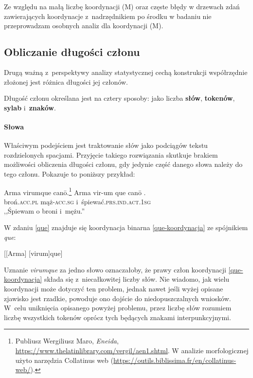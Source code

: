 Ze względu na małą liczbę koordynacji (M) oraz częste błędy w drzewach zdań zawierających koordynacje z~nadrzędnikiem po środku w badaniu nie przeprowadzam osobnych analiz dla koordynacji (M).

\subsection{Obliczanie długości członu}

Drugą ważną z~perspektywy analizy statystycznej cechą konstrukcji współrzędnie złożonej jest różnica długości jej członów.

Długość członu określana jest na cztery sposoby: jako liczba \textbf{słów}, \textbf{tokenów}, \textbf{sylab} i~\textbf{znaków}.

\paragraph{Słowa}
Właściwym podejściem jest traktowanie słów jako podciągów tekstu rozdzielonych spacjami. Przyjęcie takiego rozwiązania skutkuje brakiem możliwości obliczenia długości członu, gdy jedynie część danego słowa należy do tego członu. Pokazuje to poniższy przykład:

\begin{exe}
\ex  \label{que}
Arma virumque canō.\footnote{Publiusz Wergiliusz Maro, \textit{Eneida},
\url{https://www.thelatinlibrary.com/vergil/aen1.shtml}. W analizie morfologicznej użyto narzędzia Collatinus web (\url{https://outils.biblissima.fr/en/collatinus-web/}).}
\gll Arma vir-um que canō . \\
broń\textsc{.acc.pl} mąż\textsc{-acc.sg} i~śpiewać\textsc{.prs.ind.act.1sg} \\
\glt ,,Śpiewam o broni i~mężu.''
\end{exe}

W zdaniu \eqref{que} znajduje się koordynacja binarna \eqref{que-koordynacja} ze spójnikiem \textit{que}:

\begin{exe}
\ex \label{que-koordynacja}
{[[Arma] [virum]que]}
\end{exe}

Uznanie \textit{virumque} za jedno słowo oznaczałoby, że prawy człon koordynacji \eqref{que-koordynacja} składa się z~niecałkowitej liczby słów. Nie wiadomo, jak wielu koordynacji może dotyczyć ten problem, jednak nawet jeśli wyżej opisane zjawisko jest rzadkie, powoduje ono dojście do niedopuszczalnych wniosków. W~celu uniknięcia opisanego powyżej problemu, przez liczbę słów rozumiem liczbę wszystkich tokenów oprócz tych będących znakami interpunkcyjnymi. 


